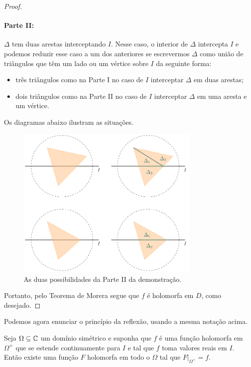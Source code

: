 \begin{proof}
        \paragraph{Parte II:} $\Delta$ tem duas arestas interceptando $I$. Nesse caso, o interior
        de $\Delta$ intercepta $I$ e podemos reduzir esse caso a um dos anteriores se escrevermos 
        $\Delta$ como união de triângulos que têm um lado ou um vértice sobre $I$ da seguinte forma:
        \begin{itemize}
            \item três triângulos como na Parte I no caso de $I$ interceptar $\Delta$
            em duas arestas;
            \item dois triângulos como na Parte II no caso de $I$ interceptar $\Delta$
            em uma aresta e um vértice.
        \end{itemize}
        Os diagramas abaixo ilustram as situações.
        \begin{figure}[H]\centering
            \includegraphics[width=0.8\textwidth]{
                Figuras/aula 6 slide 16.pdf
            }
            \caption{As duas possibilidades da Parte II da demonstração.}
        \end{figure}
        Portanto, pelo Teorema de Morera segue que $f$ é holomorfa em $D$, como desejado.
    \end{proof}
    
    Podemos agora enunciar o princípio da reflexão, usando a mesma notação acima.
    
    \begin{teorema}
    \label{teo-reflexao-schwarz}
        Seja $\Omega\subseteq\mathbb{C}$ um domínio simétrico e
        suponha que $f$ é uma função holomorfa em $\Omega^+$ que se estende 
        continuamente para $I$ e tal que $f$ toma valores reais em $I$. 
        Então existe uma função $F$ holomorfa em todo o $\Omega$ tal que
        $F\big|_{\Omega^+} = f$.
    \end{teorema}
        
